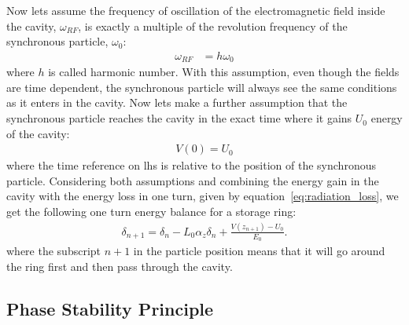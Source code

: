 	Now lets assume the frequency of oscillation of the electromagnetic field inside the cavity, $\omega_{RF}$, is exactly a multiple of the revolution frequency of the synchronous particle, $\omega_0$:
	\begin{align}\label{eq:harmonic_number}
		\omega_{RF} &= h\omega_0
	\end{align}
	where $h$ is called harmonic number. With this assumption, even though the fields are time dependent, the synchronous particle will always see the same conditions as it enters in the cavity. Now lets make a further assumption that the synchronous particle reaches the cavity in the exact time where it gains $U_0$ energy of the cavity:
	\begin{align}\label{eq:synchronous_phase_condition}
		V(0) = U_0
	\end{align}
	where the time reference on \gls{lhs} is relative to the position of the synchronous particle. Considering both assumptions and combining the energy gain in the cavity with the energy loss in one turn, given by equation~\eqref{eq:radiation_loss}, we get the following one turn energy balance for a storage ring:
	\begin{align}\label{eq:energy_balance}
		\delta_{n+1} = \delta_n - L_0\alpha_z\delta_n + \frac{V(z_{n+1})-U_0}{E_0}.
	\end{align}
	where the subscript $n+1$ in the particle position means that it will go around the ring first and then pass through the cavity.

\subsection{Phase Stability Principle}

